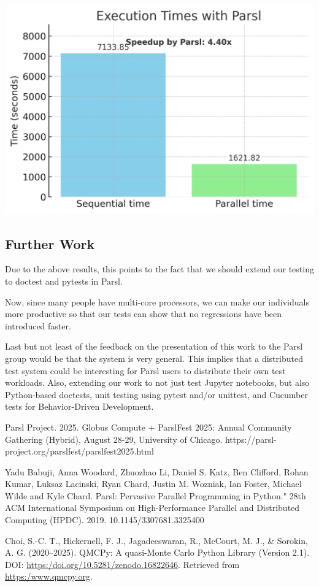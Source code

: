 \begin{center}
    \centering
    \includegraphics[width=.7\textwidth]{booktests/parsl_speedup_chart_no_x_lines.png}
    \label{fig:parsl_speedup}
\end{center}

\subsection{Further Work}

Due to the above results, this points to the fact that we should extend our testing to doctest and pytests in Parsl.

Now, since many people have multi-core processors, we can make our individuals more productive so that our tests can show that no regressions have been introduced faster.

Last but not least of the feedback on the presentation of this work to the Parsl group would be that the system is very general. This implies that a distributed test system could be interesting for Parsl users to distribute their own test workloads. 
Also, extending our work to not just test Jupyter notebooks, but also Python-based doctests, unit testing using pytest and/or unittest, and Cucumber tests for Behavior-Driven Development.


\begin{thebibliography}{6}

Parsl Project. 2025. Globus Compute + ParslFest 2025: Annual Community Gathering (Hybrid), August 28-29, University of Chicago. https://parsl-project.org/parslfest/parslfest2025.html

Yadu Babuji, Anna Woodard, Zhuozhao Li, Daniel S. Katz, Ben Clifford, Rohan Kumar, Luksaz Lacinski, Ryan Chard, Justin M. Wozniak, Ian Foster, Michael Wilde and Kyle Chard. Parsl: Pervasive Parallel Programming in Python." 28th ACM International Symposium on High-Performance Parallel and Distributed Computing (HPDC). 2019. 10.1145/3307681.3325400

Choi, S.-C. T., Hickernell, F. J., Jagadeeswaran, R., McCourt, M. J., \& Sorokin, A. G. (2020--2025).
QMCPy: A quasi-Monte Carlo Python Library (Version 2.1).
DOI: \url{https:/doi.org/10.5281/zenodo.16822646}. 
Retrieved from \url{https:/www.qmcpy.org}.

\end{thebibliography}
